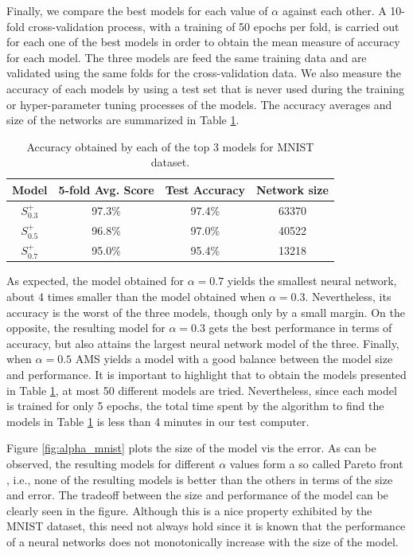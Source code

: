 \documentclass[12pt]{elsart}%
\begin{document}
Finally, we compare the best models for each value of $\alpha$ against each other. A 10-fold cross-validation process, with a training of 50 epochs per fold, is carried out for each one of the best models in order to obtain the mean measure of accuracy for each model. The three models are feed the same training data and are validated using the same folds for the cross-validation data. We also measure the accuracy of each models by using a test set that is never used during the training or hyper-parameter tuning processes of the models. The accuracy averages and size of the networks are summarized in Table \ref{table:avg_accuracies_mnist}. 

\begin{table}[!htb]
\begin{center}
\caption{Accuracy obtained by each of the top 3 models for MNIST dataset.}
\label{table:avg_accuracies_mnist}
\vspace{12pt}
\begin{tabular}{| c | c | c | c |}
\hline
Model & 5-fold Avg. Score & Test Accuracy & Network size\\
\hline
$S^+_{0.3}$ & 97.3\% & 97.4\% & 63370\\
$S^+_{0.5}$ & 96.8\% & 97.0\% & 40522\\
$S^+_{0.7}$ & 95.0\% & 95.4\% & 13218\\
\hline
\end{tabular}
\end{center}
\end{table}

As expected, the model obtained for $\alpha = 0.7$ yields the smallest neural network, about 4 times smaller than the model obtained when $\alpha = 0.3$. Nevertheless, its accuracy is the worst of the three models, though only by a small margin. On the opposite, the resulting model for $\alpha = 0.3$ gets the best performance in terms of accuracy, but also attains the largest neural network model of the three. Finally, when $\alpha = 0.5$ AMS yields a model with a good balance between the model size and performance. It is important to highlight that to obtain the models presented in Table \ref{table:avg_accuracies_mnist}, at most 50 different models are tried. Nevertheless, since each model is trained for only 5 epochs, the total time spent by the algorithm to find the models in Table \ref{table:avg_accuracies_mnist} is less than 4 minutes in our test computer. 

Figure \ref{fig:alpha_mnist} plots the size of the model vis the error. As can be observed, the resulting models for different $\alpha$ values form a so called Pareto front \cite{Nocedal06}, i.e., none of the resulting models is better than the others in terms of the size and error. The tradeoff between the size and performance of the model can be clearly seen in the figure. Although this is a nice property exhibited by the MNIST dataset, this need not always hold since it is known that the performance of a neural networks does not monotonically increase with the size of the model. 
\end{document}
